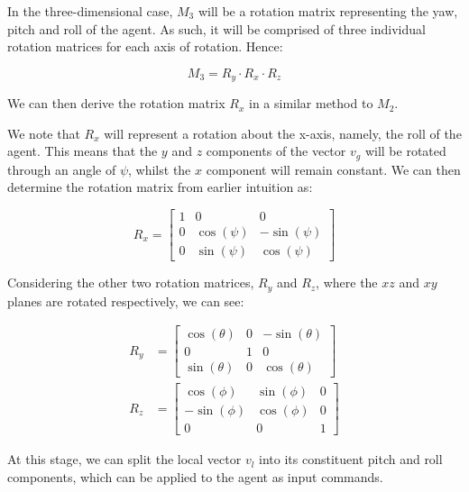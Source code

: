 \documentclass[12pt]{article}
\begin{document}
In the three-dimensional case, $M_3$ will be a rotation matrix representing the yaw, pitch and roll of the agent. As such, it will be comprised of three individual rotation matrices for each axis of rotation. Hence:

\begin{equation}
    M_3 = R_y \cdot R_x \cdot R_z
\end{equation}

We can then derive the rotation matrix $R_x$ in a similar method to $M_2$.

We note that $R_x$ will represent a rotation about the x-axis, namely, the roll of the agent. This means that the $y$ and $z$ components of the vector $v_g$ will be rotated through an angle of $\psi$, whilst the $x$ component will remain constant. We can then determine the rotation matrix from earlier intuition as:

\begin{equation}
    R_x =
    \begin{bmatrix}
        1 & 0 & 0 \\
        0 & \cos(\psi) & -\sin(\psi) \\
        0 & \sin(\psi) & \cos(\psi)
    \end{bmatrix}
\end{equation}

Considering the other two rotation matrices, $R_y$ and $R_z$, where the $xz$ and $xy$ planes are rotated respectively, we can see:

\begin{equation}
    \begin{aligned}
        R_y &=
        \begin{bmatrix}
        \cos(\theta) & 0 & -\sin(\theta) \\
        0 & 1 & 0 \\
        \sin(\theta) & 0 & \cos(\theta)
        \end{bmatrix}
        \\
        R_z &=
        \begin{bmatrix}
        \cos(\phi) & \sin(\phi) & 0 \\
        -\sin(\phi) & \cos(\phi) & 0 \\
        0 & 0 & 1
        \end{bmatrix} 
    \end{aligned}
\end{equation}

At this stage, we can split the local vector $v_l$ into its constituent pitch and roll components, which can be applied to the agent as input commands.
\end{document}
